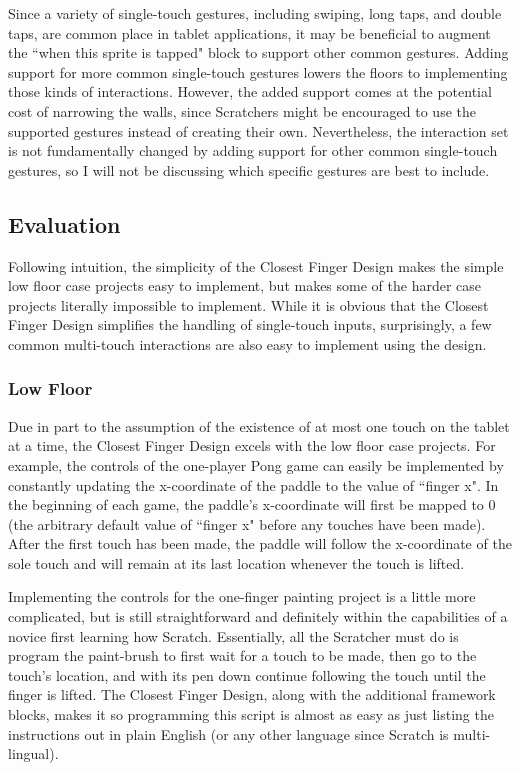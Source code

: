 Since a variety of single-touch gestures, including swiping, long taps, and double taps, are common place in tablet applications, it may be beneficial to augment the ``when this sprite is tapped" block to support other common gestures. Adding support for more common single-touch gestures lowers the floors to implementing those kinds of interactions. However, the added support comes at the potential cost of narrowing the walls, since Scratchers might be encouraged to use the supported gestures instead of creating their own. Nevertheless, the interaction set is not fundamentally changed by adding support for other common single-touch gestures, so I will not be discussing which specific gestures are best to include.

\subsection{Evaluation}
Following intuition, the simplicity of the Closest Finger Design makes the simple low floor case projects easy to implement, but makes some of the harder case projects literally impossible to implement. While it is obvious that the Closest Finger Design simplifies the handling of single-touch inputs, surprisingly, a few common multi-touch interactions are also easy to implement using the design.

\subsubsection{Low Floor}
Due in part to the assumption of the existence of at most one touch on the tablet at a time, the  Closest Finger Design excels with the low floor case projects. For example, the controls of the one-player Pong game can easily be implemented by constantly updating the x-coordinate of the paddle to the value of ``finger x". In the beginning of each game, the paddle's x-coordinate will first be mapped to $0$ (the arbitrary default value of ``finger x" before any touches have been made). After the first touch has been made, the paddle will follow the x-coordinate of the sole touch and will remain at its last location whenever the touch is lifted.

Implementing the controls for the one-finger painting project is a little more complicated, but is still straightforward and definitely within the capabilities of a novice first learning how Scratch. Essentially, all the Scratcher must do is program the paint-brush to first wait for a touch to be made, then go to the touch's location, and with its pen down continue following the touch until the finger is lifted. The Closest Finger Design, along with the additional framework blocks, makes it so programming this script is almost as easy as just listing the instructions out in plain English (or any other language since Scratch is multi-lingual).

